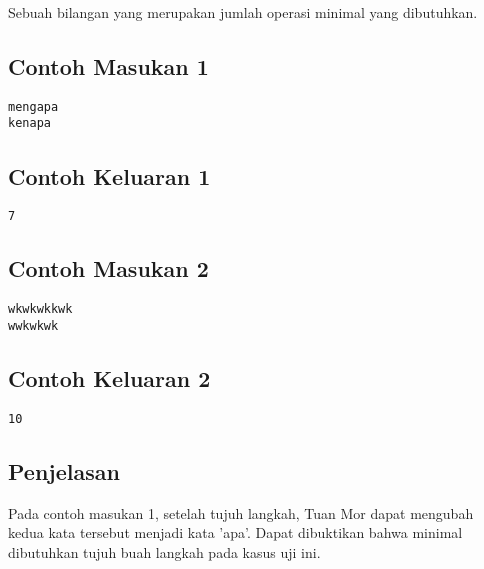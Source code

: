 \documentclass{article}
\begin{document}
Sebuah bilangan yang merupakan jumlah operasi minimal yang dibutuhkan.
\\

\begin{multicols}{2}
\subsection*{Contoh Masukan 1}
\begin{lstlisting}
mengapa
kenapa
\end{lstlisting}
\columnbreak
\subsection*{Contoh Keluaran 1}
\begin{lstlisting}
7
\end{lstlisting}
\vfill
\null
\end{multicols}

\begin{multicols}{2}
\subsection*{Contoh Masukan 2}
\begin{lstlisting}
wkwkwkkwk
wwkwkwk
\end{lstlisting}
\columnbreak
\subsection*{Contoh Keluaran 2}
\begin{lstlisting}
10
\end{lstlisting}
\vfill
\null
\end{multicols}

\subsection*{Penjelasan}
Pada contoh masukan 1, setelah tujuh langkah, Tuan Mor dapat mengubah kedua kata tersebut menjadi kata 'apa'.
Dapat dibuktikan bahwa minimal dibutuhkan tujuh buah langkah pada kasus uji ini.

\pagebreak
\end{document}
